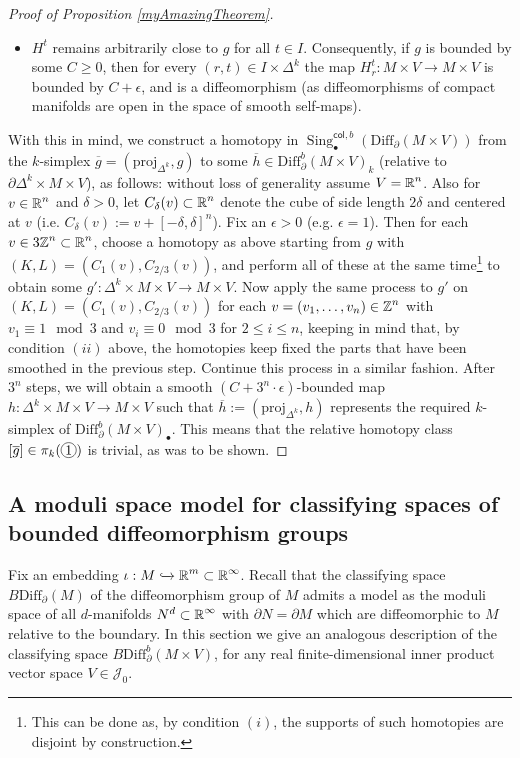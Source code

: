 \documentclass[a4paper, oneside]{amsart}
\newcommand{\diff}{\mathrm{Diff}}
\newcommand{\1}{\mathds{1}}
\newcommand{\Sing}{\operatorname{Sing}}
\newcommand*\circled[1]{\tikz[baseline=(char.base)]{%
            \node[shape=circle,draw,inner sep=1pt] (char) {#1};}}
\theoremstyle{remark}
\theoremstyle{definition}
\newcommand{\R}{{\scaleobj{0.97}{\mathbb{R}}}}
\newcommand{\Z}{{\scaleobj{0.97}{\mathbb{Z}}}}
\numberwithin{equation}{section}
\begin{document}
\begin{proof}[Proof of Proposition \ref{myAmazingTheorem}]
\begin{itemize}
    \item[$(iv)$] $H^t$ remains arbitrarily close to $g$ for all $t\in I$. Consequently, if $g$ is bounded by some $C\geq 0$, then for every $(r,t)\in I\times \Delta^k$ the map $H_r^t: M\times V\to M\times V$ is bounded by $C+\epsilon$, and is a diffeomorphism (as diffeomorphisms of compact manifolds are open in the space of smooth self-maps).
\end{itemize}
With this in mind, we construct a homotopy in $\Sing^{\mathsf{col}, b}_\bullet(\diff_\partial(M\times V))$ from the $k$-simplex $\overline{g}=(\mathrm{proj}_{\Delta^k},g)$ to some $\overline{h}\in \diff_\partial^b(M\times V)_k$ (relative to $\partial\Delta^k\times M\times V$), as follows: without loss of generality assume $V=\R^n$. Also for $v\in \R^n$ and $\delta>0$, let $C_\delta(v)\subset  \R^n$ denote the cube of side length $2\delta$ and centered at $v$ (i.e. $C_\delta(v):=v+[-\delta,\delta]^{n}$). Fix an $\epsilon>0$ (e.g. $\epsilon=1$). Then for each $v\in 3\Z^n\subset \R^n$, choose a homotopy as above starting from $g$ with $(K,L)=(C_1(v), C_{2/3}(v))$, and perform all of these at the same time\footnote{This can be done as, by condition $(i)$, the supports of such homotopies are disjoint by construction.} to obtain some $g': \Delta^k\times M\times V\to M\times V$. Now apply the same process to $g'$ on $(K,L)=(C_1(v), C_{2/3}(v))$ for each $v=(v_1,\dots, v_n)\in \Z^n$ with $v_1\equiv 1\mod 3$ and $v_i\equiv 0\mod 3$ for $2\leq i\leq n$, keeping in mind that, by condition $(ii)$ above, the homotopies keep fixed the parts that have been smoothed in the previous step. Continue this process in a similar fashion. After $3^n$ steps, we will obtain a smooth $(C+3^n\cdot\epsilon)$-bounded map $h: \Delta^k\times M\times V\to M\times V$ such that $\overline h:=(\mathrm{proj}_{\Delta^k},h)$ represents the required $k$-simplex of $\diff_\partial^b(M\times V)_\bullet$. This means that the relative homotopy class $[\overline{g}]\in\pi_k(\circled{1})$ is trivial, as was to be shown. 
\end{proof}


\subsection{A moduli space model for classifying spaces of bounded diffeomorphism groups}\label{bdiffbmodelsection}

Fix an embedding $\iota: M\xhookrightarrow{}\R^m\subset \R^\infty$. Recall that the classifying space $B\diff_\partial(M)$ of the diffeomorphism group of $M$ admits a model as the moduli space of all $d$-manifolds $N^d\subset \R^\infty$ with $\partial N=\partial M$ which are diffeomorphic to $M$ relative to the boundary. In this section we give an analogous description of the classifying space $B\diff^b_\partial(M\times V)$, for any real finite-dimensional inner product vector space $V\in \mathcal J_0$.
\end{document}
